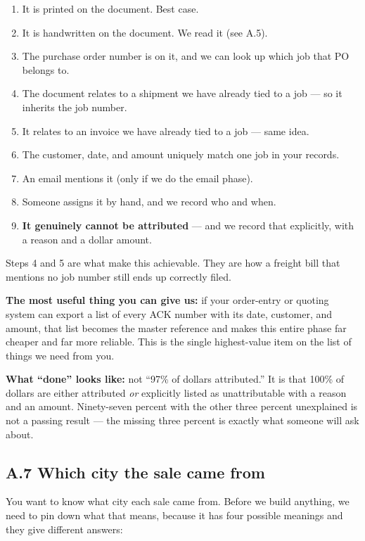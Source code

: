 \documentclass[
]{article}
\providecommand{\tightlist}{%
  \setlength{\itemsep}{0pt}\setlength{\parskip}{0pt}}
\begin{document}
\begin{enumerate}
\def\labelenumi{\arabic{enumi}.}
\tightlist
\item
  It is printed on the document. Best case.
\item
  It is handwritten on the document. We read it (see A.5).
\item
  The purchase order number is on it, and we can look up which job that
  PO belongs to.
\item
  The document relates to a shipment we have already tied to a job ---
  so it inherits the job number.
\item
  It relates to an invoice we have already tied to a job --- same idea.
\item
  The customer, date, and amount uniquely match one job in your records.
\item
  An email mentions it (only if we do the email phase).
\item
  Someone assigns it by hand, and we record who and when.
\item
  \textbf{It genuinely cannot be attributed} --- and we record that
  explicitly, with a reason and a dollar amount.
\end{enumerate}

Steps 4 and 5 are what make this achievable. They are how a freight bill
that mentions no job number still ends up correctly filed.

\textbf{The most useful thing you can give us:} if your order-entry or
quoting system can export a list of every ACK number with its date,
customer, and amount, that list becomes the master reference and makes
this entire phase far cheaper and far more reliable. This is the single
highest-value item on the list of things we need from you.

\textbf{What ``done'' looks like:} not ``97\% of dollars attributed.''
It is that 100\% of dollars are either attributed \emph{or} explicitly
listed as unattributable with a reason and an amount. Ninety-seven
percent with the other three percent unexplained is not a passing result
--- the missing three percent is exactly what someone will ask about.

\subsection{A.7 Which city the sale came
from}\label{a.7-which-city-the-sale-came-from}

You want to know what city each sale came from. Before we build
anything, we need to pin down what that means, because it has four
possible meanings and they give different answers:
\end{document}
